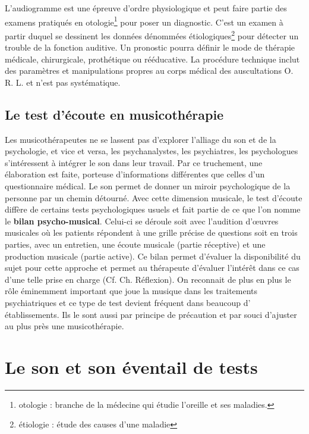   L'audiogramme est une épreuve d'ordre physiologique et peut faire partie des examens  pratiqués en otologie\footnote{otologie : branche de la médecine
  	qui étudie l'oreille et ses maladies.} pour poser un diagnostic.
   C'est un examen à partir duquel se
  dessinent les données dénommées étiologiques\footnote{étiologie : étude des causes
  	d'une maladie} pour détecter un trouble de la fonction auditive. Un pronostic pourra définir le mode de thérapie
médicale, chirurgicale, prothétique ou rééducative. La procédure
technique inclut des paramètres et manipulations propres au corps
médical des auscultations O. R. L. et  n'est pas systématique.






\subsection{Le test d'écoute en musicothérapie}

Les musicothérapeutes ne se lassent pas d'explorer l'alliage du son
 et de la psychologie, et vice
 et versa, les psychanalystes, les psychiatres, les psychologues
 s'intéressent à intégrer le son dans leur travail. Par ce truchement,
 une élaboration est faite, porteuse d'informations différentes que
 celles d'un questionnaire médical. Le son permet de donner un miroir
 psychologique de la personne par un chemin détourné. Avec cette dimension
 musicale, le test d'écoute diffère de certains tests psychologiques usuels
 et fait partie de ce que l'on nomme le \textbf{ bilan
   psycho-musical}. Celui-ci se déroule soit avec l'audition d'\oe uvres
 musicales où les patients répondent à une grille précise de questions
  soit en trois parties, avec un entretien,
 une écoute musicale (partie réceptive) et une production musicale
 (partie active).
Ce bilan permet d'évaluer la disponibilité du sujet pour cette
approche et permet au thérapeute d'évaluer l'intérêt dans ce cas
d'une telle prise en charge (Cf. Ch. Réflexion).
 On reconnait de plus en plus le rôle éminemment important que joue la musique
 dans les traitements psychiatriques et ce type de test devient
 fréquent dans beaucoup d' établissements. Ils le sont aussi par principe de précaution et
 par souci d'ajuster au plus près une
 musicothérapie.




\section{Le son et son éventail de tests}
\label{musicothEtpsycho}

